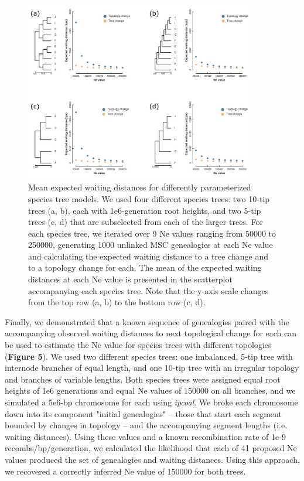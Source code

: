 \documentclass[11pt]{article}
\begin{document}
\begin{figure}
	\centering
	\includegraphics[width=0.9\textwidth]{figures/Fig5-waiting_times_ne_means.pdf}
	\caption{Mean expected waiting distances for differently parameterized species tree models. We used four different species trees: two 10-tip trees (a, b), each with 1e6-generation root heights, and two 5-tip trees (c, d) that are subselected from each of the larger trees. For each species tree, we iterated over 9 Ne values ranging from 50000 to 250000, generating 1000 unlinked MSC genealogies at each Ne value and calculating the expected waiting distance to a tree change and to a topology change for each. The mean of the expected waiting distances at each Ne value is presented in the scatterplot accompanying each species tree. Note that the y-axis scale changes from the top row (a, b) to the bottom row (c, d).}
\end{figure}


Finally, we demonstrated that a known sequence of genealogies paired with the accompanying observed waiting distances to next topological change for each can be used to estimate the Ne value for species trees with different topologies (\textbf{Figure 5}). We used two different species trees: one imbalanced, 5-tip tree with internode branches of equal length, and one 10-tip tree with an irregular topology and branches of variable lengths. Both species trees were assigned equal root heights of 1e6 generations and equal Ne values of 150000 on all branches, and we simulated a 5e6-bp chromosome for each using \emph{ipcoal}. We broke each chromosome down into its component "initial genealogies" -- those that start each segment bounded by changes in topology -- and the accompanying segment lengths (i.e. waiting distances). Using these values and a known recombination rate of 1e-9 recombs/bp/generation, we calculated the likelihood that each of 41 proposed Ne values produced the set of genealogies and waiting distances. Using this approach, we recovered a correctly inferred Ne value of 150000 for both trees.
\end{document}

